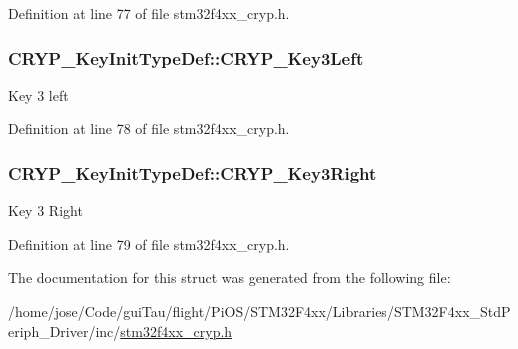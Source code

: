 Definition at line 77 of file stm32f4xx\-\_\-cryp.\-h.

\hypertarget{struct_c_r_y_p___key_init_type_def_ae6a251405882c694e0d24a85e6d7222b}{
\subsubsection[{C\-R\-Y\-P\-\_\-\-Key3\-Left}]{ C\-R\-Y\-P\-\_\-\-Key\-Init\-Type\-Def\-::\-C\-R\-Y\-P\-\_\-\-Key3\-Left}}\label{struct_c_r_y_p___key_init_type_def_ae6a251405882c694e0d24a85e6d7222b}
Key 3 left 

Definition at line 78 of file stm32f4xx\-\_\-cryp.\-h.

\hypertarget{struct_c_r_y_p___key_init_type_def_afc24dd3ea3e7391f62ce4583ab4ae563}{
\subsubsection[{C\-R\-Y\-P\-\_\-\-Key3\-Right}]{ C\-R\-Y\-P\-\_\-\-Key\-Init\-Type\-Def\-::\-C\-R\-Y\-P\-\_\-\-Key3\-Right}}\label{struct_c_r_y_p___key_init_type_def_afc24dd3ea3e7391f62ce4583ab4ae563}
Key 3 Right 

Definition at line 79 of file stm32f4xx\-\_\-cryp.\-h.



The documentation for this struct was generated from the following file\-:\begin{DoxyCompactItemize}
\item 
/home/jose/\-Code/gui\-Tau/flight/\-Pi\-O\-S/\-S\-T\-M32\-F4xx/\-Libraries/\-S\-T\-M32\-F4xx\-\_\-\-Std\-Periph\-\_\-\-Driver/inc/\hyperlink{stm32f4xx__cryp_8h}{stm32f4xx\-\_\-cryp.\-h}\end{DoxyCompactItemize}
